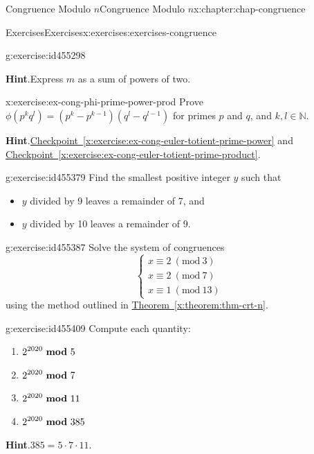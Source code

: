 \documentclass[oneside,10pt,]{book}
\newcommand{\blocktitlefont}{\relax}
\newcommand{\xreffont}{\relax}
\numberwithin{equation}{section}
\newcommand{\Mod}[1]{\ \left(\mathrm{mod}\ #1\right)}
\newcommand{\mmod}[1]{\ \mathrm{\bf mod}\ #1}
\begin{document}
\begin{chapterptx}{Congruence Modulo \(n\)}{}{Congruence Modulo \(n\)}{}{}{x:chapter:chap-congruence}
\begin{exercises-section}{Exercises}{}{Exercises}{}{}{x:exercises:exercises-congruence}
\begin{divisionexercise}{15}{}{}{g:exercise:id455298}
\par\smallskip%
\noindent\textbf{\blocktitlefont Hint}.\hypertarget{g:hint:id455325}{}\quad{}Express \(m\) as a sum of powers of two.%
\end{divisionexercise}%
\begin{divisionexercise}{16}{}{}{x:exercise:ex-cong-phi-prime-power-prod}%
Prove \(\phi(p^kq^l) = \left(p^k-p^{k-1}\right)\left(q^l - q^{l-1}\right)\) for primes \(p\) and \(q\), and \(k,l\in\mathbb{N}\).%
\par\smallskip%
\noindent\textbf{\blocktitlefont Hint}.\hypertarget{g:hint:id455381}{}\quad{}\hyperref[x:exercise:ex-cong-euler-totient-prime-power]{Checkpoint~{\xreffont\ref{x:exercise:ex-cong-euler-totient-prime-power}}} and \hyperref[x:exercise:ex-cong-euler-totient-prime-product]{Checkpoint~{\xreffont\ref{x:exercise:ex-cong-euler-totient-prime-product}}}.%
\end{divisionexercise}%
\begin{divisionexercise}{17}{}{}{g:exercise:id455379}%
Find the smallest positive integer \(y\) such that%
\begin{itemize}[label=\textbullet]
\item{}\(y\) divided by 9 leaves a remainder of 7, and%
\item{}\(y\) divided by 10 leaves a remainder of 9.%
\end{itemize}
%
\end{divisionexercise}%
\begin{divisionexercise}{18}{}{}{g:exercise:id455387}%
Solve the system of congruences%
\begin{equation*}
\begin{cases} x \equiv 2 \Mod{3} \\
x \equiv 2 \Mod{7} \\
x \equiv 1 \Mod{13} \end{cases}
\end{equation*}
using the method outlined in \hyperref[x:theorem:thm-crt-n]{Theorem~{\xreffont\ref{x:theorem:thm-crt-n}}}.%
\end{divisionexercise}%
\begin{divisionexercise}{19}{}{}{g:exercise:id455409}%
Compute each quantity:%
\begin{enumerate}[label=(\alph*)]
\item{}\(\displaystyle 2^{2020} \mmod{5}\)%
\item{}\(\displaystyle 2^{2020} \mmod{7}\)%
\item{}\(\displaystyle 2^{2020} \mmod{11}\)%
\item{}\(\displaystyle 2^{2020} \mmod{385}\)%
\end{enumerate}
%
\par\smallskip%
\noindent\textbf{\blocktitlefont Hint}.\hypertarget{g:hint:id455433}{}\quad{}\(385 = 5 \cdot 7 \cdot 11\).%
\end{divisionexercise}%
\end{exercises-section}
\end{chapterptx}
\end{document}
